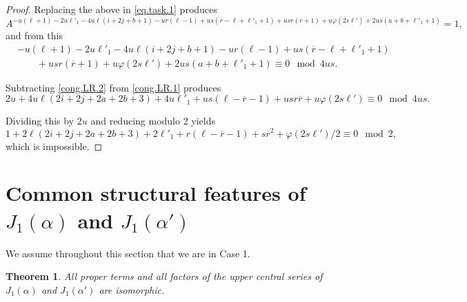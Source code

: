 \documentclass{amsart}
\newtheorem{theorem}{Theorem}[section]
\theoremstyle{definition}
\theoremstyle{remark}
\begin{document}
\begin{proof}

Replacing the above in \eqref{eq.task.1} produces
\[
A^{-u(\ell + 1)  - 2u\ell'_1 - 4u\ell(i + 2j + b + 1) - ur(\ell - 1) + us(\overline{r} - \ell + \ell'_1 + 1) + usr(\overline{r} + 1) + u\varphi(2s\ell') + 2us(a + b + \ell'_1 + 1)}
= 1,
\]
and from this
\begin{equation}\label{cong.LR.2}
    \begin{split}
        &-u(\ell + 1)  - 2u\ell'_1 - 4u\ell(i + 2j + b + 1) - ur(\ell - 1) + us(\overline{r} - \ell + \ell'_1 + 1)\\
        &\qquad + usr(\overline{r} + 1) + u\varphi(2s\ell') + 2us(a + b + \ell'_1 + 1)\equiv 0\mod 4us.
    \end{split}
\end{equation}

Subtracting \eqref{cong.LR.2} from \eqref{cong.LR.1} produces
\[
2u + 4u\ell(2i + 2j + 2a + 2b + 3) + 4u\ell'_1 + us(\ell - \overline{r} - 1) + usr\overline{r} + u\varphi(2s\ell')
\equiv0\mod 4us.
\]

Dividing this by $2u$ and reducing modulo 2 yields
\[
1 + 2\ell(2i + 2j + 2a + 2b + 3) + 2\ell'_1 + r(\ell - \overline{r} - 1) + s\overline{r}^2 + \varphi(2s\ell')/2
\equiv0\mod 2,
\]
which is impossible.



\end{proof}

\section{Common structural features of $J_1(\alpha)$ and $J_1(\alpha')$}

We assume throughout this section that we are in Case 1.

\begin{theorem}\label{csf1} All proper terms and all factors of the upper central series of $J_1(\alpha)$ and $J_1(\alpha')$ are isomorphic.
\end{theorem}
\end{document}
